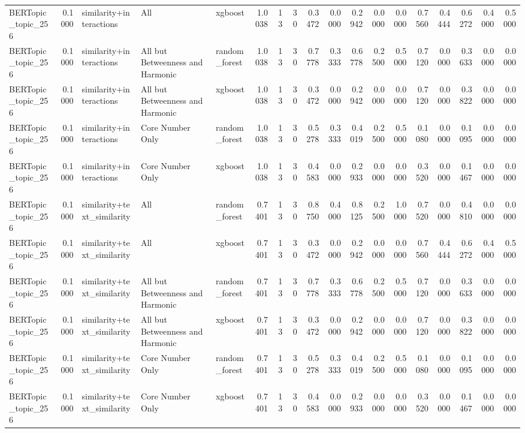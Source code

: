 \begin{tabular}{lrlllrrrrrrrrrrrrr}
BERTopic_topic_256 & 0.1000 & similarity+interactions & All & xgboost & 1.0038 & 13 & 30 & 0.3472 & 0.0000 & 0.2942 & 0.0000 & 0.0000 & 0.7560 & 0.4444 & 0.6272 & 0.4000 & 0.5000 \\
BERTopic_topic_256 & 0.1000 & similarity+interactions & All but Betweenness and Harmonic & random_forest & 1.0038 & 13 & 30 & 0.7778 & 0.3333 & 0.6778 & 0.2500 & 0.5000 & 0.7120 & 0.0000 & 0.3633 & 0.0000 & 0.0000 \\
BERTopic_topic_256 & 0.1000 & similarity+interactions & All but Betweenness and Harmonic & xgboost & 1.0038 & 13 & 30 & 0.3472 & 0.0000 & 0.2942 & 0.0000 & 0.0000 & 0.7120 & 0.0000 & 0.3822 & 0.0000 & 0.0000 \\
BERTopic_topic_256 & 0.1000 & similarity+interactions & Core Number Only & random_forest & 1.0038 & 13 & 30 & 0.5278 & 0.3333 & 0.4019 & 0.2500 & 0.5000 & 0.1080 & 0.0000 & 0.1095 & 0.0000 & 0.0000 \\
BERTopic_topic_256 & 0.1000 & similarity+interactions & Core Number Only & xgboost & 1.0038 & 13 & 30 & 0.4583 & 0.0000 & 0.2933 & 0.0000 & 0.0000 & 0.3520 & 0.0000 & 0.1467 & 0.0000 & 0.0000 \\
BERTopic_topic_256 & 0.1000 & similarity+text_similarity & All & random_forest & 0.7401 & 13 & 30 & 0.8750 & 0.4000 & 0.8125 & 0.2500 & 1.0000 & 0.7520 & 0.0000 & 0.4810 & 0.0000 & 0.0000 \\
BERTopic_topic_256 & 0.1000 & similarity+text_similarity & All & xgboost & 0.7401 & 13 & 30 & 0.3472 & 0.0000 & 0.2942 & 0.0000 & 0.0000 & 0.7560 & 0.4444 & 0.6272 & 0.4000 & 0.5000 \\
BERTopic_topic_256 & 0.1000 & similarity+text_similarity & All but Betweenness and Harmonic & random_forest & 0.7401 & 13 & 30 & 0.7778 & 0.3333 & 0.6778 & 0.2500 & 0.5000 & 0.7120 & 0.0000 & 0.3633 & 0.0000 & 0.0000 \\
BERTopic_topic_256 & 0.1000 & similarity+text_similarity & All but Betweenness and Harmonic & xgboost & 0.7401 & 13 & 30 & 0.3472 & 0.0000 & 0.2942 & 0.0000 & 0.0000 & 0.7120 & 0.0000 & 0.3822 & 0.0000 & 0.0000 \\
BERTopic_topic_256 & 0.1000 & similarity+text_similarity & Core Number Only & random_forest & 0.7401 & 13 & 30 & 0.5278 & 0.3333 & 0.4019 & 0.2500 & 0.5000 & 0.1080 & 0.0000 & 0.1095 & 0.0000 & 0.0000 \\
BERTopic_topic_256 & 0.1000 & similarity+text_similarity & Core Number Only & xgboost & 0.7401 & 13 & 30 & 0.4583 & 0.0000 & 0.2933 & 0.0000 & 0.0000 & 0.3520 & 0.0000 & 0.1467 & 0.0000 & 0.0000 \\

\end{tabular}
